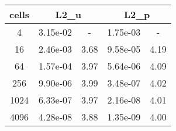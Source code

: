 \documentclass[10pt]{report}
\begin{document}
\begin{table}[H]
\begin{center}
\begin{tabular}{|c|c|c|c|c|} \hline
cells & 
\multicolumn{2}{|c|}{L2_u} & 
\multicolumn{2}{|c|}{L2_p}\\ \hline
4 & 3.15e-02 & - & 1.75e-03 & -\\ \hline
16 & 2.46e-03 & 3.68 & 9.58e-05 & 4.19\\ \hline
64 & 1.57e-04 & 3.97 & 5.64e-06 & 4.09\\ \hline
256 & 9.90e-06 & 3.99 & 3.48e-07 & 4.02\\ \hline
1024 & 6.33e-07 & 3.97 & 2.16e-08 & 4.01\\ \hline
4096 & 4.28e-08 & 3.88 & 1.35e-09 & 4.00\\ \hline
\end{tabular}
\end{center}
\end{table}
\end{document}
